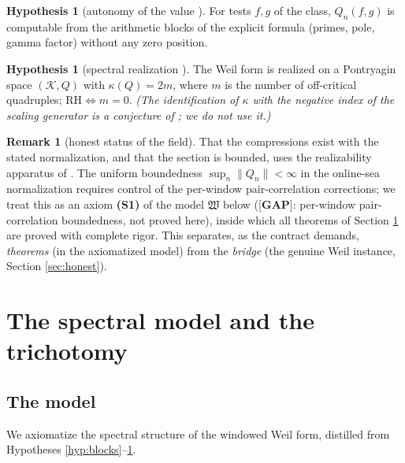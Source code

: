 \documentclass[11pt,reqno]{amsart}
\theoremstyle{definition}
\newtheorem{remark}[theorem]{Remark}
\newtheorem{assumption}[theorem]{Hypothesis}
\newcommand{\GAP}{\textbf{[GAP]}}
\begin{document}
\begin{assumption}[autonomy of the value {\cite{P39,P35}}]\label{hyp:autonomy}
For tests \(f,g\) of the class, \(Q_n(f,g)\) is computable from the arithmetic
blocks of the explicit formula (primes, pole, gamma factor) without any zero
position.
\end{assumption}

\begin{assumption}[spectral realization {\cite{P35}}]\label{hyp:spectral}
The Weil form is realized on a Pontryagin space \((\mathcal K,Q)\) with
\(\kappa(Q)=2m\), where \(m\) is the number of off-critical quadruples;
\(\mathrm{RH}\iff m=0\). \emph{(The identification of \(\kappa\) with the
negative index of the scaling generator is a conjecture of \cite{P35}; we do not
use it.)}
\end{assumption}

\begin{remark}[honest status of the field]\label{rem:field-status}
That the compressions exist with the stated normalization, and that the section
is bounded, uses the realizability apparatus of \cite{P40}. The uniform
boundedness \(\sup_n\|Q_n\|<\infty\) in the online-sea normalization requires
control of the per-window pair-correlation corrections; we treat this as an
axiom \textbf{(S1)} of the model \(\mathfrak W\) below
(\(\GAP\): per-window pair-correlation boundedness, not proved here), inside
which all theorems of Section \ref{sec:trichotomy} are proved with complete
rigor. This separates, as the contract demands, \emph{theorems} (in the
axiomatized model) from the \emph{bridge} (the genuine Weil instance, Section
\ref{sec:honest}).
\end{remark}

\section{The spectral model and the trichotomy}\label{sec:trichotomy}

\subsection{The model}
We axiomatize the spectral structure of the windowed Weil form, distilled from
Hypotheses \ref{hyp:blocks}--\ref{hyp:spectral}.
\end{document}
